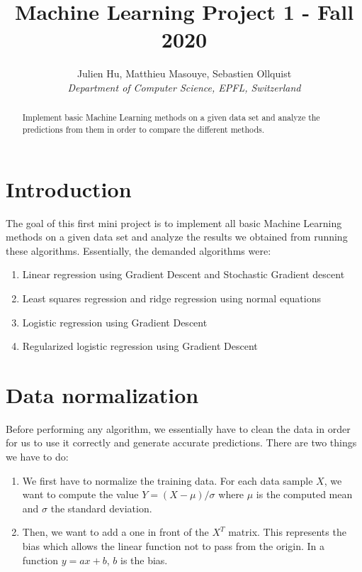 \documentclass[10pt,conference,compsocconf]{IEEEtran}
\begin{document}
\title{Machine Learning Project 1 - Fall 2020}

\author{
  Julien Hu, Matthieu Masouye, Sebastien Ollquist\\
  \textit{Department of Computer Science, EPFL, Switzerland}
}

\maketitle

\begin{abstract}
  Implement basic Machine Learning methods on a given data set and analyze the predictions from them in order to compare the different methods.
\end{abstract}

\section{Introduction}
The goal of this first mini project is to implement all basic Machine Learning methods on a given data set and analyze the results we obtained from running these algorithms. Essentially, the demanded algorithms were:
\begin{enumerate}
  \item Linear regression using Gradient Descent and Stochastic Gradient descent
  \item Least squares regression and ridge regression using normal equations
  \item Logistic regression using Gradient Descent
  \item Regularized logistic regression using Gradient Descent
\end{enumerate}

\section{Data normalization}
Before performing any algorithm, we essentially have to clean the data in order for us to use it correctly and generate accurate predictions. There are two things we have to do:
\begin{enumerate}
  \item We first have to normalize the training data. For each data sample $X$, we want to compute the value $Y=(X-\mu)/\sigma$ where $\mu$ is the computed mean and $\sigma$ the standard deviation.
  \item Then, we want to add a one in front of the $X^T$ matrix. This represents the bias which allows the linear function not to pass from the origin. In a function $y=ax+b$, $b$ is the bias.
\end{enumerate}
\end{document}
